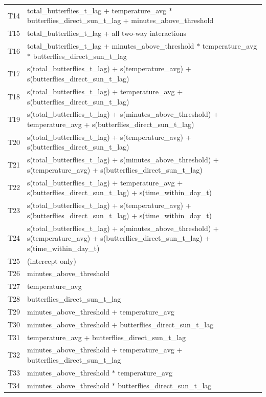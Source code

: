 \documentclass[insects,article,submit,pdftex,moreauthors]{Definitions/mdpi}
\begin{document}
\begin{appendix}
\begin{longtable}{ll}
T14 & total\_butterflies\_t\_lag + temperature\_avg $*$ butterflies\_direct\_sun\_t\_lag + minutes\_above\_threshold \\
T15 & total\_butterflies\_t\_lag + all two-way interactions \\
T16 & total\_butterflies\_t\_lag + minutes\_above\_threshold $*$ temperature\_avg $*$ butterflies\_direct\_sun\_t\_lag \\
T17 & s(total\_butterflies\_t\_lag) + s(temperature\_avg) + s(butterflies\_direct\_sun\_t\_lag) \\
T18 & s(total\_butterflies\_t\_lag) + temperature\_avg + s(butterflies\_direct\_sun\_t\_lag) \\
T19 & s(total\_butterflies\_t\_lag) + s(minutes\_above\_threshold) + temperature\_avg + s(butterflies\_direct\_sun\_t\_lag) \\
T20 & s(total\_butterflies\_t\_lag) + s(temperature\_avg) + s(butterflies\_direct\_sun\_t\_lag) \\
T21 & s(total\_butterflies\_t\_lag) + s(minutes\_above\_threshold) + s(temperature\_avg) + s(butterflies\_direct\_sun\_t\_lag) \\
T22 & s(total\_butterflies\_t\_lag) + temperature\_avg + s(butterflies\_direct\_sun\_t\_lag) + s(time\_within\_day\_t) \\
T23 & s(total\_butterflies\_t\_lag) + s(temperature\_avg) + s(butterflies\_direct\_sun\_t\_lag) + s(time\_within\_day\_t) \\
T24 & s(total\_butterflies\_t\_lag) + s(minutes\_above\_threshold) + s(temperature\_avg) + s(butterflies\_direct\_sun\_t\_lag) + s(time\_within\_day\_t) \\
T25 & (intercept only) \\
T26 & minutes\_above\_threshold \\
T27 & temperature\_avg \\
T28 & butterflies\_direct\_sun\_t\_lag \\
T29 & minutes\_above\_threshold + temperature\_avg \\
T30 & minutes\_above\_threshold + butterflies\_direct\_sun\_t\_lag \\
T31 & temperature\_avg + butterflies\_direct\_sun\_t\_lag \\
T32 & minutes\_above\_threshold + temperature\_avg + butterflies\_direct\_sun\_t\_lag \\
T33 & minutes\_above\_threshold $*$ temperature\_avg \\
T34 & minutes\_above\_threshold $*$ butterflies\_direct\_sun\_t\_lag \\

\end{longtable}
\end{appendix}
\end{document}

